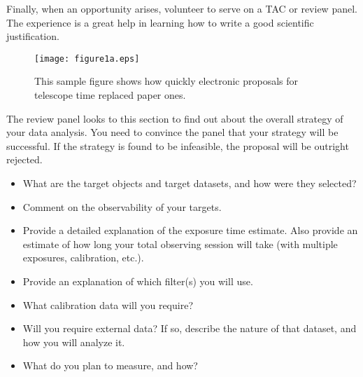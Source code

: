 \documentclass[11pt]{article}
\begin{document}
Finally, when an opportunity arises, volunteer to serve on
a TAC or review panel.  The experience is a great help in
learning how to write a good scientific justification.



\begin{figure}[hbt]
\texttt{[image: figure1a.eps]}
\caption{This sample figure shows how quickly electronic proposals
for telescope time replaced paper ones.}
\end{figure}


\clearpage


%

%

\expdesign
The review panel looks to this section to find out about the overall
strategy of your data analysis.  You need to convince the panel that your strategy will be successful.  If the strategy is found to be infeasible, the proposal will be outright rejected.

\begin{itemize}
  
\item
  What are the target objects and target datasets, and how were they selected?

\item
  Comment on the observability of your targets.

\item
  Provide a detailed explanation of the exposure time estimate.  Also provide an estimate of how long your total observing session will take (with multiple exposures, calibration, etc.).

\item
  Provide an explanation of which filter(s) you will use.
  
\item
  What calibration data will you require?

\item
  Will you require external data?  If so, describe the nature of that dataset, and how you will analyze it.
  
\item
  What do you plan to measure, and how?

\end{itemize}
 
\end{document}
